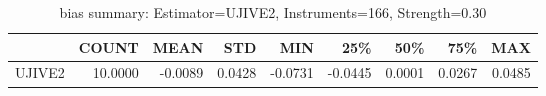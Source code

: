 \begin{table}[ht]
\centering
\caption{bias summary: Estimator=UJIVE2, Instruments=166, Strength=0.30}
\begin{tabular}{lrrrrrrrr}
\toprule
 & COUNT & MEAN & STD & MIN & 25\% & 50\% & 75\% & MAX \\
\midrule
UJIVE2 & 10.0000 & -0.0089 & 0.0428 & -0.0731 & -0.0445 & 0.0001 & 0.0267 & 0.0485 \\
\bottomrule
\end{tabular}
\end{table}

